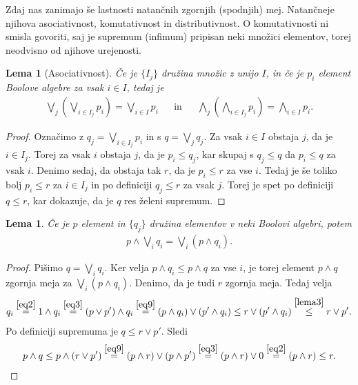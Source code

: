 \documentclass{amsart}
\newtheorem{lema}[izrek]{Lema}
\begin{document}

Zdaj nas zanimajo še lastnosti natančnih zgornjih (spodnjih) mej. Natančneje njihova asociativnost, komutativnost
in distributivnost. O komutativnosti ni smisla govoriti, saj je supremum (infimum) pripisan neki množici elementov, torej neodvisno od njihove urejenosti.

\begin{lema}[Asociativnost]
    Če je \(\{I_j\}\) družina množic z unijo \(I\), in če je \(p_i\) element Boolove algebre za vsak \(i \in I\), tedaj je
    \begin{align*}
        \bigvee_{j}\left(\bigvee_{i \in I_j} p_i\right) = \bigvee_{i \in I} p_i && \text{in} && \bigwedge_{j}\left(\bigwedge_{i \in I_j} p_i\right) = \bigwedge_{i \in I} p_i.
    \end{align*}
\end{lema}

\begin{proof}
    Označimo z \(q_j = \bigvee_{i \in I_j} p_i\) in s \(q = \bigvee_j q_j\).
    Za vsak \(i \in I\) obstaja \(j\), da je \(i \in I_j\). Torej za vsak \(i\)
    obstaja \(j\), da je \(p_i \leq q_j\), kar skupaj s \(q_j \leq q\) da \(p_i \leq q\) za vsak \(i\).
    Denimo sedaj, da obstaja tak \(r\), da je \(p_i \leq r\) za vse \(i\). Tedaj je še toliko bolj
    \(p_i \leq r\) za \(i \in I_j\) in po definiciji \(q_j \leq r\) za vsak \(j\).
    Torej je spet po definiciji \(q \leq r\), kar dokazuje, da je \(q\) res želeni supremum.

\end{proof}

\begin{lema}
    Če je \(p\) element in \(\{q_j\}\) družina elementov v neki Boolovi algebri, potem
    \begin{align*}
        p \wedge \bigvee_i q_i = \bigvee_i (p \wedge q_i).
    \end{align*}
\end{lema}

\begin{proof}
    Pišimo \(q = \bigvee_i q_i\). Ker velja \(p \wedge q_i \leq p \wedge q\) za vse \(i\),
    je torej element \(p \wedge q\) zgornja meja za \(\bigvee_i (p \wedge q_i).\)
    Denimo, da je tudi \(r\) zgornja meja. Tedaj velja
    \begin{align*}
        q_i \stackrel{\eqref{eq2}}{=} 1 \wedge q_i \stackrel{\eqref{eq3}}{=} (p \vee p') \wedge q_i \stackrel{\eqref{eq9}}{=} \left(p \wedge q_i\right) \vee
        \left(p' \wedge q_i\right) \leq r \vee \left(p' \wedge q_i\right) \stackrel{\ref{lema3}}{\leq}  r \vee p'.
    \end{align*}
    Po definiciji supremuma je \(q \leq r \vee p'\). Sledi
    \begin{align*}
        p \wedge q \leq p \wedge \left(r \vee p'\right) \stackrel{\eqref{eq9}}{=}
        \left(p \wedge r\right) \vee \left(p \wedge p'\right) \stackrel{\eqref{eq3}}{=} \left(p \wedge r\right) \vee 0 \stackrel{\eqref{eq2}}{=} \left(p \wedge r\right) \leq r.
    \end{align*}
\end{proof}
\end{document}
